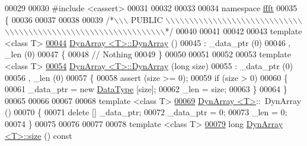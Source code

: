 \begin{DoxyCode}
00029 
00030 \textcolor{preprocessor}{#include    <cassert>}
00031 
00032 
00033 
00034 \textcolor{keyword}{namespace }\hyperlink{a00142}{ffft}
00035 \{
00036 
00037 
00038 
00039 \textcolor{comment}{/*\(\backslash\)\(\backslash\)\(\backslash\) PUBLIC \(\backslash\)\(\backslash\)\(\backslash\)\(\backslash\)\(\backslash\)\(\backslash\)\(\backslash\)\(\backslash\)\(\backslash\)\(\backslash\)\(\backslash\)\(\backslash\)\(\backslash\)\(\backslash\)\(\backslash\)\(\backslash\)\(\backslash\)\(\backslash\)\(\backslash\)\(\backslash\)\(\backslash\)\(\backslash\)\(\backslash\)\(\backslash\)\(\backslash\)\(\backslash\)\(\backslash\)\(\backslash\)\(\backslash\)\(\backslash\)\(\backslash\)\(\backslash\)\(\backslash\)\(\backslash\)\(\backslash\)\(\backslash\)\(\backslash\)\(\backslash\)\(\backslash\)\(\backslash\)\(\backslash\)\(\backslash\)\(\backslash\)\(\backslash\)\(\backslash\)\(\backslash\)\(\backslash\)\(\backslash\)\(\backslash\)\(\backslash\)\(\backslash\)\(\backslash\)\(\backslash\)\(\backslash\)\(\backslash\)\(\backslash\)\(\backslash\)\(\backslash\)\(\backslash\)\(\backslash\)\(\backslash\)\(\backslash\)\(\backslash\)*/}
00040 
00041 
00042 
00043 \textcolor{keyword}{template} <\textcolor{keyword}{class} T>
\hypertarget{a00092_source_l00044}{}\hyperlink{a00007_a3a1bc9474a3891360464c4ad97d846ff}{00044} \hyperlink{a00007}{DynArray <T>::DynArray} ()
00045 :   \_data\_ptr (0)
00046 ,   \_len (0)
00047 \{
00048     \textcolor{comment}{// Nothing}
00049 \}
00050 
00051 
00052 
00053 \textcolor{keyword}{template} <\textcolor{keyword}{class} T>
\hypertarget{a00092_source_l00054}{}\hyperlink{a00007_a26919351a30b4be36c3e3ee500a7c6a7}{00054} \hyperlink{a00007}{DynArray <T>::DynArray} (\textcolor{keywordtype}{long} size)
00055 :   \_data\_ptr (0)
00056 ,   \_len (0)
00057 \{
00058     assert (size >= 0);
00059     \textcolor{keywordflow}{if} (size > 0)
00060     \{
00061         \_data\_ptr = \textcolor{keyword}{new} \hyperlink{a00007_aa21fa88c73e511acb18a7e778190ab02}{DataType} [size];
00062         \_len = size;
00063     \}
00064 \}
00065 
00066 
00067 
00068 \textcolor{keyword}{template} <\textcolor{keyword}{class} T>
\hypertarget{a00092_source_l00069}{}\hyperlink{a00007_a0467340a0c0b5cbb47683c665e21ffd6}{00069} \hyperlink{a00007}{DynArray <T>}::~DynArray ()
00070 \{
00071     \textcolor{keyword}{delete} [] \_data\_ptr;
00072     \_data\_ptr = 0;
00073     \_len = 0;
00074 \}
00075 
00076 
00077 
00078 \textcolor{keyword}{template} <\textcolor{keyword}{class} T>
\hypertarget{a00092_source_l00079}{}\hyperlink{a00007_aab5a878741b62b079c94db354357127d}{00079} \textcolor{keywordtype}{long}    \hyperlink{a00007}{DynArray <T>::size} () \textcolor{keyword}{const}

\end{DoxyCode}
